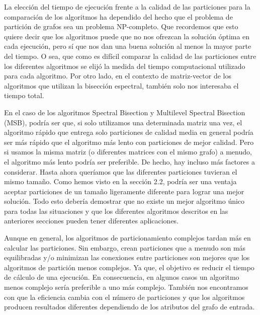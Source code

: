 La elección del tiempo de ejecución frente a la calidad de las particiones para la comparación de los algoritmos ha dependido del hecho que el problema de partición de grafos sea un problema NP-completo\cite{NPCompleteness}. Que recordemos que esto quiere decir que los algoritmos puede que no nos ofrezcan la solución óptima en cada ejecución, pero sí que nos dan una buena solución al menos la mayor parte del tiempo. O sea, que como es difícil comparar la calidad de las particiones entre los diferentes algoritmos se elijó la medida del tiempo computacional utilizado para cada algoritmo. Por otro lado, en el contexto de matriz-vector de los algoritmos que utilizan la bisección espectral, también solo nos interesaba el tiempo total. 

En el caso de los algoritmos Spectral Bisection y Multilevel Spectral Bisection (MSB), podría ser que, si solo utilizamos una determinada matriz una vez, el algoritmo rápido que entrega solo particiones de calidad media en general podría ser más rápido que el algoritmo más lento con particiones de mejor calidad. Pero si usamos la misma matriz (o diferentes matrices con el mismo grafo) a menudo, el algoritmo más lento podría ser preferible. De hecho, hay incluso más factores a considerar. Hasta ahora queríamos que las diferentes particiones tuvieran el mismo tamaño. Como hemos visto en la sección 2.2, podría ser una ventaja aceptar particiones de un tamaño ligeramente diferente para lograr una mejor solución. Todo esto debería demostrar que no existe un mejor algoritmo único para todas las situaciones y que los diferentes algoritmos descritos en las anteriores secciones pueden tener diferentes aplicaciones.

Aunque en general, los algoritmos de particionamiento complejos tardan más en calcular las particiones. Sin embargo, crean particiones que a menudo son más equilibradas y/o minimizan las conexiones entre particiones son mejores que los algoritmos de partición menos complejos. Ya que, el objetivo es reducir el tiempo de cálculo de una ejecución. En consecuencia, en algunos casos un algoritmo menos complejo sería preferible a uno más complejo. También nos encontramos con que la eficiencia cambia con el número de particiones y que los algoritmos producen resultados diferentes dependiendo de los atributos del grafo de entrada.